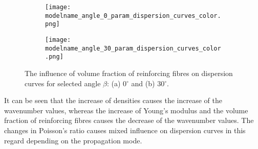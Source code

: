 \documentclass[preprint,12pt]{elsarticle}
\begin{document}
\begin{figure} [h!]
	\centering
	\newcommand{\modelname}{SASE8_plain_weave}
	\begin{subfigure}[b]{0.49\textwidth}
		\centering
		\texttt{[image: \\modelname\_angle\_0\_param\_dispersion\_curves\_color.png]}
		\caption{}
		\label{fig:vol0}
	\end{subfigure}
	\hfill
	\begin{subfigure}[b]{0.49\textwidth}
		\centering
		\texttt{[image: \\modelname\_angle\_30\_param\_dispersion\_curves\_color.png]}
		\caption{}
		\label{fig:vol30}
	\end{subfigure}
	\caption{The influence of volume fraction of reinforcing fibres on dispersion curves for selected angle $\beta$: (a) 0$^{\circ}$ and (b) 30$^{\circ}$.} 
	\label{fig:vol}
\end{figure}

It can be seen that the increase of densities causes the increase of the wavenumber values, whereas the increase of  Young's modulus and the volume fraction of reinforcing fibres causes the decrease of the wavenumber values. The changes in Poisson's ratio causes mixed influence on dispersion curves in this regard depending on the propagation mode.
\end{document}

